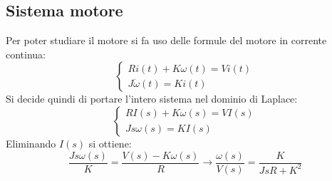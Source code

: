 \documentclass{report}
\begin{document}
\subsection{Sistema motore}
Per poter studiare il motore si fa uso delle formule del motore in corrente continua:
\begin{equation}
  \begin{cases}
    Ri(t)+K\omega(t)=Vi(t)\\
    J\dot \omega(t)=Ki(t)    
  \end{cases}
\end{equation}
Si decide quindi di portare l'intero sistema nel dominio di Laplace:
\begin{equation}
  \begin{cases}
    RI(s)+K\omega(s)=VI(s)\\
    Js\omega(s)=KI(s)    
  \end{cases}
\end{equation}
Eliminando $I(s)$ si ottiene:
\begin{equation}
  \frac{Js\omega(s)}{K}=\frac{V(s)-K\omega(s)}{R}\longrightarrow\frac{\omega(s)}{V(s)}=\frac{K}{JsR+K^2}
\end{equation}
\end{document}
